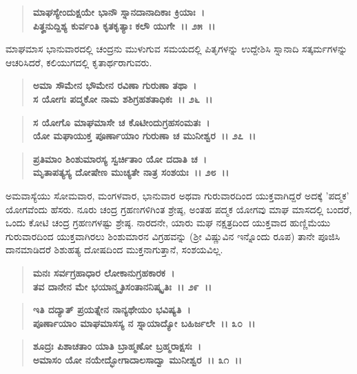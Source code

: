 \begin{verse}
\textbf{ಮಾಘಸ್ಯೇಂದುಕ್ಷಯೇ ಭಾನೌ ಸ್ನಾನದಾನಾದಿಕಾಃ ಕ್ರಿಯಾಃ~।}\\\textbf{ಪಿತೄನುದ್ದಿಶ್ಯ ಕುರ್ವಂತಿ ಕೃತಕೃತ್ಯಾಃ ಕಲೌ ಯುಗೇ~।। ೨೫~।।}
\end{verse}

ಮಾಘಮಾಸ ಭಾನುವಾರದಲ್ಲಿ ಚಂದ್ರನು ಮುಳುಗುವ ಸಮಯದಲ್ಲಿ ಪಿತೃಗಳನ್ನು ಉದ್ದೇಶಿಸಿ ಸ್ನಾನಾದಿ ಸತ್ಕರ್ಮಗಳನ್ನು ಆಚರಿಸಿದರೆ, ಕಲಿಯುಗದಲ್ಲಿ ಕೃತಾರ್ಥರಾಗುವರು.

\begin{verse}
\textbf{ಅಮಾ ಸೌಮೇನ ಭೌಮೇನ ರವಿಣಾ ಗುರುಣಾ ತಥಾ~।}\\\textbf{ಸ ಯೋಗಃ ಪದ್ಮಕೋ ನಾಮ ಶಶಿಗ್ರಹಶತಾಧಿಕಃ~।। ೨೬~।। }
\end{verse}

\begin{verse}
\textbf{ಸ ಯೋಗೊ ಮಾಘಮಾಸೇ ಚ ಕೊಟೀಂದುಗ್ರಹಸಂಮತಃ~।}\\\textbf{ಯೋ ಮಘಾಯುಕ್ತ ಪೂರ್ಣಾಯಾಂ ಗುರುಣಾ ಚ ಮುನೀಶ್ವರ~।। ೨೭~।। }
\end{verse}

\begin{verse}
\textbf{ಪ್ರತಿಮಾಂ ಶಿಂಶುಮಾರಸ್ಯ ಸ್ವರ್ಚಿತಾಂ ಯೋ ದದಾತಿ ಚ~।}\\\textbf{ಮೃತಾಪತ್ಯಸ್ಯ ದೋಷೇಣ ಮುಚ್ಯತೇ ನಾತ್ರ ಸಂಶಯಃ~।। ೨೮~।।}
\end{verse}

ಅಮವಾಸ್ಯೆಯು ಸೋಮವಾರ, ಮಂಗಳವಾರ, ಭಾನುವಾರ ಅಥವಾ ಗುರುವಾರದಿಂದ ಯುಕ್ತವಾಗಿದ್ದರೆ ಅದಕ್ಕೆ 'ಪದ್ಮಕ' ಯೋಗವೆಂದು ಹೆಸರು. ನೂರು ಚಂದ್ರ ಗ್ರಹಣಗಳಿಗಿಂತ ಶ್ರೇಷ್ಠ, ಅಂತಹ ಪದ್ಮಕ ಯೋಗವು ಮಾಘ ಮಾಸದಲ್ಲಿ ಬಂದರೆ, ಒಂದು ಕೋಟಿ ಚಂದ್ರ ಗ್ರಹಣಗಳಷ್ಟು ಶ್ರೇಷ್ಠ. ನಾರದನೇ, ಯಾರು ಮಘ ನಕ್ಷತ್ರದಿಂದ ಯುಕ್ತವಾದ ಹುಣ್ಣಿಮೆಯು ಗುರುವಾರದಿಂದ ಯುಕ್ತವಾಗಿರಲು ಶಿಂಶುಮಾರನ ವಿಗ್ರಹವನ್ನು (ಶ‍್ರೀ ವಿಷ್ಣುವಿನ ಇನ್ನೊಂದು ರೂಪ) ತಾನೇ ಪೂಜಿಸಿ ದಾನಮಾಡಿದರೆ ಶಿಶುಹತ್ಯ ದೋಷದಿಂದ ಮುಕ್ತನಾಗುತ್ತಾನೆ, ಸಂಶಯವಿಲ್ಲ.

\begin{verse}
\textbf{ಮನಃ ಸರ್ವಗ್ರಹಾಧಾರ ಲೋಕಾನುಗ್ರಹಕಾರಕ~।}\\\textbf{ತವ ದಾನೇನ ಮೇ ಭಯಾನ್ಮೃತಿಸಂತಾನನಿಷ್ಕೃತಿಃ~।। ೨೯~।। }
\end{verse}

\begin{verse}
\textbf{ಇತಿ ದದ್ಯಾತ್ ಪ್ರಯತ್ನೇನ ನಾನ್ಯಥೇಯಂ ಭವಿಷ್ಯತಿ~।}\\\textbf{ಪೂರ್ಣಾಯಾಂ ಮಾಘಮಾಸಸ್ಯ ನ ಸ್ನಾಯಾದ್ಯೋ ಬಹಿರ್ಜಲೇ~।। ೩೦~।। }
\end{verse}

\begin{verse}
\textbf{ಶೂದ್ರಃ ಪಿಶಾಚತಾಂ ಯಾತಿ ಬ್ರಾಹ್ಮಣೋ ಬ್ರಹ್ಮರಾಕ್ಷಸಃ~।}\\\textbf{ಅಮಾಸಂ ಯೋ ನಯೇದ್ಭೋಗಾದಾಲಸಾದ್ವಾ ಮುನೀಶ್ವರ~।। ೩೧~।।} 
\end{verse}

